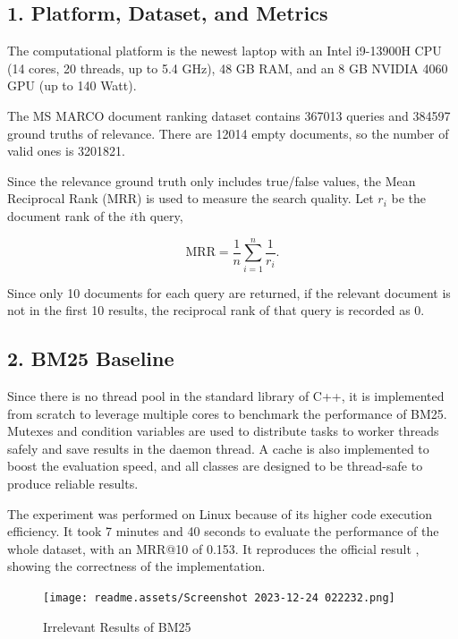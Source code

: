 \documentclass[11pt]{article}
\begin{document}
\hypertarget{1-platform-dataset-and-metrics}{%
\subsection{1. Platform, Dataset, and
Metrics}\label{1-platform-dataset-and-metrics}}

The computational platform is the newest laptop with an Intel i9-13900H
CPU (14 cores, 20 threads, up to 5.4 GHz), 48 GB RAM, and an 8 GB NVIDIA
4060 GPU (up to 140 Watt).

The MS MARCO document ranking dataset contains 367013 queries and 384597
ground truths of relevance. There are 12014 empty documents, so the
number of valid ones is 3201821.

Since the relevance ground truth only includes true/false values, the
Mean Reciprocal Rank (MRR) is used to measure the search quality. Let
\(r_i\) be the document rank of the \(i\)th query,

\begin{equation}
\text{MRR} = \frac{1}{n} \sum_{i = 1}^{n} \frac{1}{r_i}.
\end{equation}

Since only 10 documents for each query are returned, if the relevant
document is not in the first 10 results, the reciprocal rank of that
query is recorded as 0.

\hypertarget{2-bm25-baseline}{%
\subsection{2. BM25 Baseline}\label{2-bm25-baseline}}

Since there is no thread pool in the standard library of C++, it is
implemented from scratch to leverage multiple cores to benchmark the
performance of BM25. Mutexes and condition variables are used to
distribute tasks to worker threads safely and save results in the daemon
thread. A cache is also implemented to boost the evaluation speed, and
all classes are designed to be thread-safe to produce reliable results.

The experiment was performed on Linux because of its higher code
execution efficiency. It took 7 minutes and 40 seconds to evaluate the
performance of the whole dataset, with an MRR@10 of 0.153. It reproduces
the official result \cite{c8}, showing the correctness of the implementation.

\begin{figure}
\texttt{[image: readme.assets/Screenshot 2023-12-24 022232.png]}
\caption{Irrelevant Results of BM25}
\label{bm25 results}
\end{figure}
\end{document}
